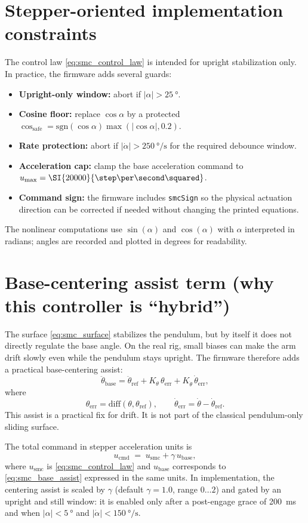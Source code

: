 \section{Stepper-oriented implementation constraints}
The control law \eqref{eq:smc_control_law} is intended for upright stabilization only. In practice, the firmware adds several guards:
\begin{itemize}
  \item \textbf{Upright-only window:} abort if $|\alpha|>\SI{25}{\degree}$.
  \item \textbf{Cosine floor:} replace $\cos\alpha$ by a protected $\cos_{\mathrm{safe}}=\mathrm{sgn}(\cos\alpha)\max(|\cos\alpha|,0.2)$.
  \item \textbf{Rate protection:} abort if $|\dot{\alpha}|>\SI{250}{\degree\per\second}$ for the required debounce window.
  \item \textbf{Acceleration cap:} clamp the base acceleration command to $u_{\max}=\SI{20000}{\step\per\second\squared}$.
  \item \textbf{Command sign:} the firmware includes \texttt{smcSign} so the physical actuation direction can be corrected if needed without changing the printed equations.
\end{itemize}
The nonlinear computations use $\sin(\alpha)$ and $\cos(\alpha)$ with $\alpha$ interpreted in radians; angles are recorded and plotted in degrees for readability.

\section{Base-centering assist term (why this controller is ``hybrid'')}
The surface \eqref{eq:smc_surface} stabilizes the pendulum, but by itself it does not directly regulate the base angle. On the real rig, small biases can make the arm drift slowly even while the pendulum stays upright. The firmware therefore adds a practical base-centering assist:
\begin{equation}
\ddot{\theta}_{\mathrm{base}}
=
\ddot{\theta}_{\mathrm{ref}}
+ K_{\theta}\,\theta_{\mathrm{err}}
+ K_{\dot{\theta}}\,\dot{\theta}_{\mathrm{err}},
\label{eq:smc_base_assist}
\end{equation}
where
\[
\theta_{\mathrm{err}}=\mathrm{diff}(\theta,\theta_{\mathrm{ref}}),\qquad
\dot{\theta}_{\mathrm{err}}=\dot{\theta}-\dot{\theta}_{\mathrm{ref}}.
\]
This assist is a practical fix for drift. It is not part of the classical pendulum-only sliding surface.

The total command in stepper acceleration units is
\[
u_{\mathrm{cmd}} \;=\; u_{\mathrm{smc}} + \gamma\,u_{\mathrm{base}},
\]
where $u_{\mathrm{smc}}$ is \eqref{eq:smc_control_law} and $u_{\mathrm{base}}$ corresponds to \eqref{eq:smc_base_assist} expressed in the same units. In implementation, the centering assist is scaled by $\gamma$ (default $\gamma=1.0$, range $0\ldots 2$) and gated by an upright and still window: it is enabled only after a post-engage grace of \SI{200}{ms} and when $|\alpha|<\SI{5}{\degree}$ and $|\dot{\alpha}|<\SI{150}{\degree\per\second}$.

